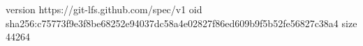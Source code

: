 version https://git-lfs.github.com/spec/v1
oid sha256:c75773f9e3f8be68252e94037dc58a4e02827f86ed609b9f5b52fe56827c38a4
size 44264
